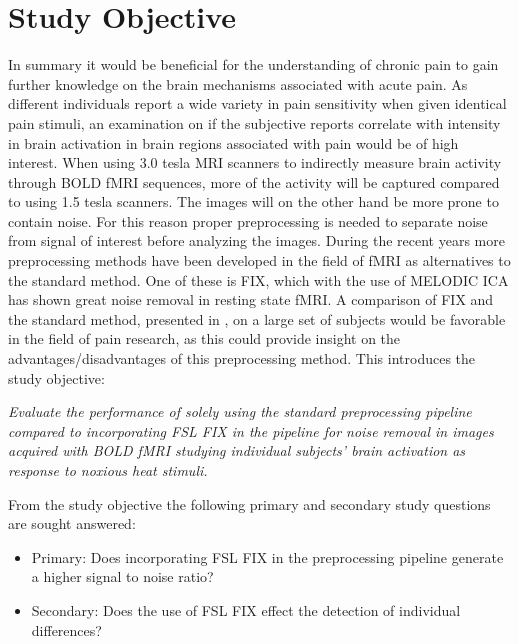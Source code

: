 \chapter{Study Objective}

In summary it would be beneficial for the understanding of chronic pain to gain further knowledge on the brain mechanisms associated with acute pain. As different individuals report a wide variety in pain sensitivity when given identical pain stimuli, an examination on if the subjective reports correlate with intensity in brain activation in brain regions associated with pain would be of high interest. When using 3.0 tesla MRI scanners to indirectly measure brain activity through BOLD fMRI sequences, more of the activity will be captured compared to using 1.5 tesla scanners. The images will on the other hand be more prone to contain noise. For this reason proper preprocessing is needed to separate noise from signal of interest before analyzing the images. During the recent years more preprocessing methods have been developed in the field of fMRI as alternatives to the standard method. One of these is FIX, which with the use of MELODIC ICA has shown great noise removal in resting state fMRI. A comparison of FIX and the standard method, presented in , on a large set of subjects would be favorable in the field of pain research, as this could provide insight on the advantages/disadvantages of this preprocessing method. This introduces the study objective:

\begin{center}

\textit{Evaluate the performance of solely using the standard preprocessing pipeline compared to incorporating FSL FIX in the pipeline for noise removal in images acquired with BOLD fMRI studying individual subjects' brain activation as response to noxious heat stimuli.}

\end{center}

From the study objective the following primary and secondary study questions are sought answered: 

\begin{itemize}
	\item Primary: Does incorporating FSL FIX in the preprocessing pipeline generate a higher signal to noise ratio?
	\item Secondary: Does the use of FSL FIX effect the detection of individual differences?  
	 
\end{itemize}

